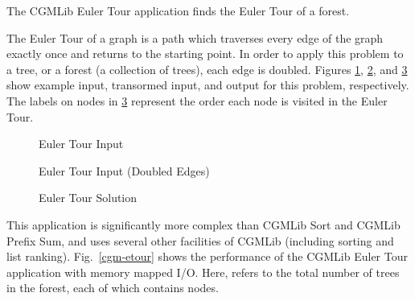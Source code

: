 \documentclass[12pt]{carletoncsthesis}
\begin{document}
The CGMLib Euler Tour application\cite{bsp-etour} finds the Euler Tour of a forest.

The Euler Tour of a graph is a path which traverses every edge of the
graph exactly once and returns to the starting point.  In order to apply
this problem to a tree, or a forest (a collection of trees), each edge is
doubled.  Figures \ref{euler-tree-start-fig}, \ref{euler-tree-doubled-fig},
and \ref{euler-tree-solved-fig} show example input, transormed input, and
output for this problem, respectively.  The labels on nodes in
\ref{euler-tree-solved-fig} represent the order each node is visited in the
Euler Tour.

\begin{figure}[h]
\begin{center}
\end{center}
\caption{Euler Tour Input}
\label{euler-tree-start-fig}
\end{figure}

\begin{figure}[h]
\begin{center}
\end{center}
\caption{Euler Tour Input (Doubled Edges)}
\label{euler-tree-doubled-fig}
\end{figure}

\begin{figure}[h]
\begin{center}
\end{center}
\caption{Euler Tour Solution}
\label{euler-tree-solved-fig}
\end{figure}

\clearpage

This application is significantly more complex than CGMLib Sort and CGMLib
Prefix Sum, and uses several other facilities of CGMLib (including sorting
and list ranking).  Fig.~\ref{cgm-etour} shows the performance of the CGMLib
Euler Tour application with memory mapped I/O.  Here,  refers to the
total number of trees in the forest, each of which contains  nodes.
\end{document}
